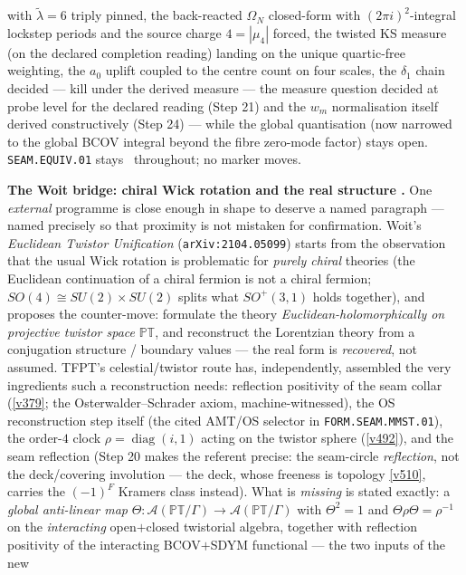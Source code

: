 \documentclass[11pt,a4paper]{article}
\theoremstyle{definition}
\begin{document}
with $\tilde\lambda=6$ triply pinned, the back-reacted $\Omega_N$ closed-form with
$(2\pi i)^2$-integral lockstep periods and the source charge $4=|\mu_4|$ forced, the twisted KS
measure (on the declared completion reading) landing on the unique quartic-free weighting, the
$a_0$ uplift coupled to the centre count on four scales, the $\delta_1$ chain decided ---
kill under the derived measure --- the measure question decided at probe level for the
declared reading (Step 21) and the $w_m$ normalisation itself derived constructively
(Step 24) --- while the
global quantisation (now narrowed to the global BCOV integral beyond the fibre zero-mode
factor) stays open.
\texttt{SEAM.EQUIV.01}
stays \mO\ throughout; no marker moves.

\par\medskip\noindent\textbf{The Woit bridge: chiral Wick rotation and the real structure \mO.}
One \emph{external} programme is close enough in shape to deserve a named paragraph --- named
precisely so that proximity is not mistaken for confirmation. Woit's \emph{Euclidean Twistor
Unification} (\texttt{arXiv:2104.05099}) starts from the observation that the usual Wick rotation is
problematic for \emph{purely chiral} theories (the Euclidean continuation of a chiral fermion is not
a chiral fermion; $SO(4)\cong SU(2){\times}SU(2)$ splits what $SO^+(3,1)$ holds together), and
proposes the counter-move: formulate the theory \emph{Euclidean-holomorphically on projective twistor
space} $\mathbb{PT}$, and reconstruct the Lorentzian theory from a conjugation structure / boundary
values --- the real form is \emph{recovered}, not assumed. TFPT's celestial/twistor route has,
independently, assembled the very ingredients such a reconstruction needs: reflection positivity of
the seam collar (\vref{v379}; the Osterwalder--Schrader axiom, machine-witnessed), the OS
reconstruction step itself (the cited AMT/OS selector in \texttt{FORM.SEAM.MMST.01}), the order-$4$
clock $\rho=\operatorname{diag}(i,1)$ acting on the twistor sphere (\vref{v492}), and the seam
reflection (Step 20 makes the referent precise: the seam-circle \emph{reflection}, not the
deck/covering involution --- the deck, whose freeness is topology \vref{v510}, carries the
$(-1)^F$ Kramers class instead).
What is \emph{missing} is stated exactly: a \emph{global anti-linear map}
$\Theta:\mathcal A(\mathbb{PT}/\Gamma)\to\mathcal A(\mathbb{PT}/\Gamma)$ with $\Theta^2=1$ and
$\Theta\rho\Theta=\rho^{-1}$ on the \emph{interacting} open$+$closed twistorial algebra, together
with reflection positivity of the interacting BCOV$+$SDYM functional --- the two inputs of the new
\end{document}
